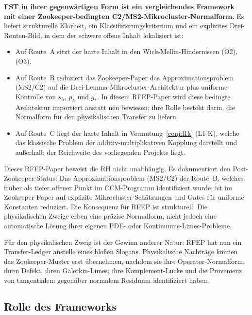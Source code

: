\documentclass[11pt,a4paper]{article}
\theoremstyle{plain}
\theoremstyle{definition}
\begin{document}
\textbf{FST in ihrer gegenwärtigen Form ist ein vergleichendes Framework
mit einer Zookeeper-bedingten C2/MS2-Mikrocluster-Normalform.}
Es liefert strukturelle Klarheit, ein Klassifizierungskriterium und ein explizites
Drei-Routen-Bild, in dem der schwere offene Inhalt lokalisiert ist:

\begin{itemize}[leftmargin=*]
\item Auf Route~A sitzt der harte Inhalt in den Wick-Mellin-Hindernissen (O2), (O3).
\item Auf Route~B reduziert das Zookeeper-Paper das Approximationsproblem (MS2/C2)
  auf die Drei-Lemma-Mikrocluster-Architektur plus uniforme Kontrolle von
  $s_\lambda$, $p_\lambda$ und $g_*$. In diesem RFEP-Paper wird diese
  bedingte Architektur importiert anstatt neu bewiesen; ihre Rolle besteht
  darin, die Normalform für den physikalischen Transfer zu liefern.
\item Auf Route~C liegt der harte Inhalt in Vermutung~\ref{conj:l1k} (L1-K),
  welche das klassische Problem der additiv-multiplikativen Kopplung darstellt
  und außerhalb der Reichweite des vorliegenden Projekts liegt.
\end{itemize}

Dieses RFEP-Paper beweist die RH nicht unabhängig. Es dokumentiert
den Post-Zookeeper-Status: Das Approximationsproblem (MS2/C2) der Route~B,
welches früher als tiefer offener Punkt im CCM-Programm identifiziert wurde,
ist im Zookeeper-Paper auf explizite Mikrocluster-Schätzungen und Gates für
uniforme Konstanten reduziert. Die Konsequenz für RFEP ist strukturell:
Die physikalischen Zweige erben eine präzise Normalform, nicht jedoch eine automatische
Lösung ihrer eigenen PDE- oder Kontinuums-Limes-Probleme.

Für den physikalischen Zweig ist der Gewinn anderer Natur: RFEP hat nun ein
Transfer-Ledger anstelle eines bloßen Slogans. Physikalische Nachträge
können das Zookeeper-Muster erst übernehmen, nachdem sie ihre Operator-Normalform,
ihren Defekt, ihren Galerkin-Limes, ihre Komplement-Lücke und die Provenienz
von tangentialem gegenüber normalem Residuum identifiziert haben.

\subsection{Rolle des Frameworks}
\end{document}
